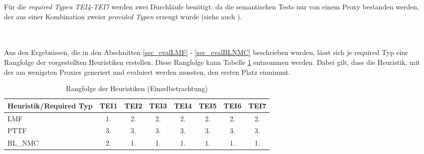\begin{multicols}{2}
\columnbreak
{}
\end{multicols}
\begin{multicols}{2}
\columnbreak
{}
\end{multicols}
\begin{multicols}{2}
\columnbreak
{}
\end{multicols}
\noindent
Für die \emph{required Typen} \emph{TEI4}-\emph{TEI7} werden zwei Durchläufe benötigt, da die semantischen Tests nur von einem Proxy bestanden werden, der aus einer Kombination zweier \emph{provided Typen} erzeugt wurde (siehe auch ).




\noindent
\\\\
Aus den Ergebnissen, die in den Abschnitten \ref{sec_evalLMF} - \ref{sec_evalBLNMC} beschrieben wurden, lässt sich je required Typ eine Rangfolge der vorgestellten Heuristiken erstellen. Diese Rangfolge kann Tabelle \ref{tab_rankingSingle} entnommen werden. Dabei gilt, dass die Heuristik, mit der am wenigsten Proxies generiert und evaluiert werden mussten, den ersten Platz einnimmt. 
\begin{table}[!h]
\centering
\begin{tabular}{|l|c|c|c|c|c|c|c|}
\hline
\hline
\textbf{Heuristik/Required Typ} & \textbf{TEI1} & \textbf{TEI2}& \textbf{TEI3}& \textbf{TEI4}& \textbf{TEI5}& \textbf{TEI6}& \textbf{TEI7}\\
\hline
\hline
LMF  &1.&2.&2.&2.&2.&2.&2.\\
\hline
PTTF  &3. &3.&3.&3.&3.&3.&3. \\
\hline
BL\_NMC & 2. &1. &1. &1. &1.&1.&1.\\
\hline
\hline
\end{tabular}
\caption{Rangfolge der Heuristiken (Einzelbetrachtung)}
\label{tab_rankingSingle}
\end{table}


